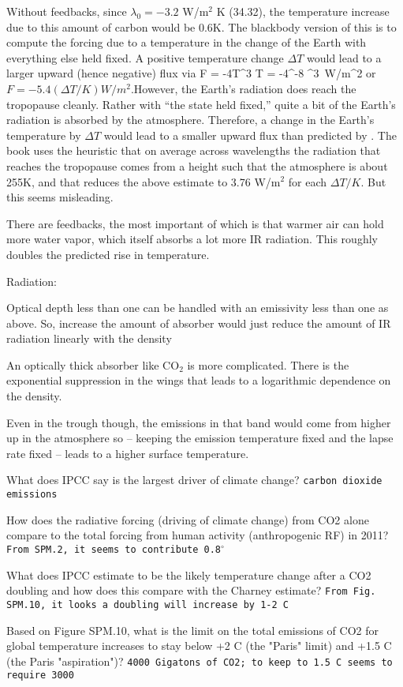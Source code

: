 \documentclass[11pt]{book}
\begin{document}
\item Without feedbacks, since $\lambda_0=-3.2$ W/m$^2$ K (34.32), the temperature increase due to this amount of carbon would be 0.6K. The blackbody version of this is to compute the forcing due to a temperature in the change of the Earth with everything else held fixed. A positive temperature change $\Delta T$ would lead to a larger upward (hence negative) flux via
\be
F = -4\sigma T^3 \Delta T = -4^{-8} ^3 \times {} \,W/m^2\ee
or
$F=-5.4 (\Delta T/K) W/m^2$.However, the Earth's radiation does reach the tropopause cleanly. Rather with ``the state held fixed,'' quite a bit of the Earth's radiation is absorbed by the atmosphere. Therefore, a change in the Earth's temperature by $\Delta T$ would lead to a smaller upward flux than predicted by . The book uses the heuristic that on average across wavelengths the radiation that reaches the tropopause comes from a height such that the atmosphere is about 255K, and that reduces the above estimate to 3.76 W/m$^2$ for each $\Delta T/K$. But this seems misleading. 
\item There are feedbacks, the most important of which is that warmer air can hold more water vapor, which itself absorbs a lot more IR radiation. This roughly doubles the predicted rise in temperature.
\eee

Radiation:
\bee
\item Optical depth less than one can be handled with an emissivity less than one as above. So, increase the amount of absorber would just reduce the amount of IR radiation linearly with the density
\item An optically thick absorber like CO$_2$ is more complicated. There is the exponential suppression in the wings that leads to a logarithmic dependence on the density.
\item Even in the trough though, the emissions in that band would come from higher up in the atmosphere so -- keeping the emission temperature fixed and the lapse rate fixed -- leads to a higher surface temperature.
\eee 

\appendix
\newcommand\ans[1]{{\tt #1}}

\bee
\item What does IPCC say is the largest driver of climate change?
\ans{carbon dioxide emissions}
\item How does the radiative forcing (driving of climate change) from CO2 alone compare to the total forcing from human activity (anthropogenic RF) in 2011?
\ans{From SPM.2, it seems to contribute 0.8$^\circ$}
\item What does IPCC estimate to be the likely temperature change after a CO2 doubling and how does this compare with the Charney estimate?
\ans{From Fig. SPM.10, it looks a doubling will increase by 1-2 C}
\item Based on Figure SPM.10, what is the limit on the total emissions of CO2 for global temperature increases to stay below +2 C (the "Paris" limit) and +1.5 C (the Paris "aspiration")?
\ans{4000 Gigatons of CO2; to keep to 1.5 C seems to require 3000}
\eee
\end{document}
